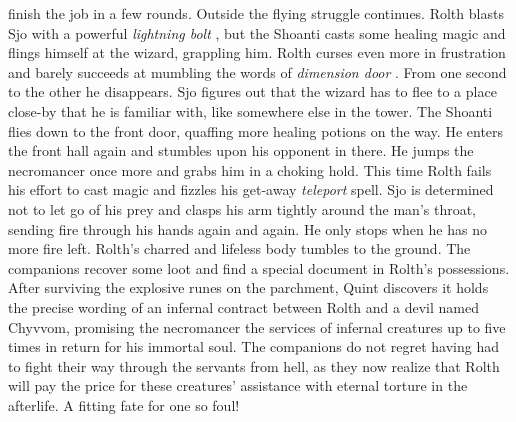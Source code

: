 finish the job in a few rounds. Outside the flying struggle continues. Rolth blasts Sjo with a powerful {\itshape lightning bolt} , but the Shoanti casts some healing magic and flings himself at the wizard, grappling him. Rolth curses even more in frustration and barely succeeds at mumbling the words of  {\itshape dimension door} . From one second to the other he disappears. Sjo figures out that the wizard has to flee to a place close-by that he is familiar with, like somewhere else in the tower. The Shoanti flies down to the front door, quaffing more healing potions on the way. He enters the front hall again and stumbles upon his opponent in there. He jumps the necromancer once more and grabs him in a choking hold. This time Rolth fails his effort to cast magic and fizzles his get-away  {\itshape teleport} spell. Sjo is determined not to let go of his prey and clasps his arm tightly around the man's throat, sending fire through his hands again and again. He only stops when he has no more fire left. Rolth's charred and lifeless body tumbles to the ground. The companions recover some loot and find a special document in Rolth's possessions. After surviving the explosive runes on the parchment, Quint discovers it holds the precise wording of an infernal contract between Rolth and a devil named Chyvvom, promising the necromancer the services of infernal creatures up to five times in return for his immortal soul. The companions do not regret having had to fight their way through the servants from hell, as they now realize that Rolth will pay the price for these creatures' assistance with eternal torture in the afterlife. A fitting fate for one so foul!\\

